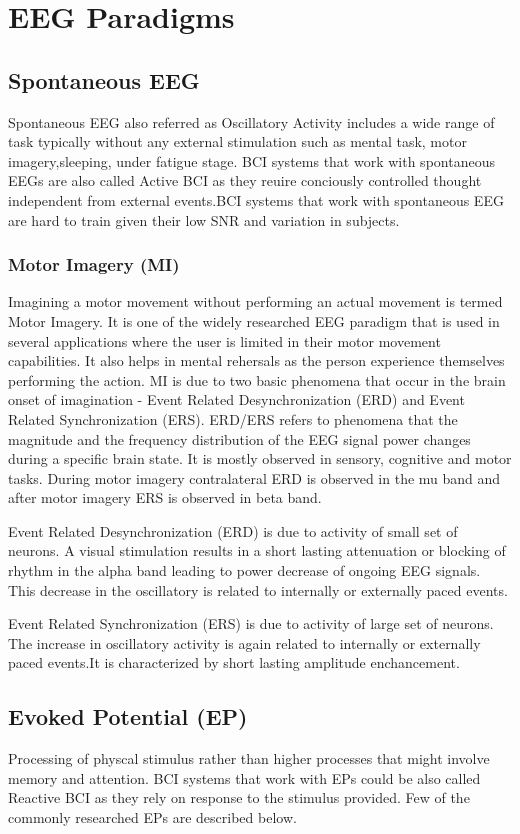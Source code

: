 \section{EEG Paradigms}

\subsection{Spontaneous EEG}
Spontaneous EEG also referred as Oscillatory Activity includes a wide range of task typically without any external stimulation such as mental task, motor imagery,sleeping, under fatigue stage. BCI systems that work with spontaneous EEGs are also called Active BCI as they reuire conciously controlled thought independent from external events.BCI systems that work with spontaneous EEG are hard to train given their low SNR and variation in subjects.

    \subsubsection{Motor Imagery (MI)}
Imagining a motor movement without performing an actual movement is termed Motor Imagery. It is one of the widely researched EEG paradigm that is used in several applications where the user is limited in their motor movement capabilities. It also helps in mental rehersals as the person experience themselves performing the action. MI is due to two basic phenomena that occur in the brain onset of imagination - Event Related Desynchronization (ERD) and Event Related Synchronization (ERS). ERD/ERS refers to 
phenomena that the magnitude and the frequency distribution of the EEG signal power changes during a specific brain state. It is mostly observed in sensory, cognitive and motor tasks. During motor imagery contralateral ERD is observed in the mu band and after motor imagery ERS is observed in beta band.

Event Related Desynchronization (ERD) is due to activity of small set of neurons. A visual stimulation results in a short lasting attenuation or blocking of rhythm in the alpha band leading to power decrease of ongoing EEG signals. This decrease in the oscillatory is related to internally or externally paced events.

Event Related Synchronization (ERS) is due to activity of large set of neurons. The increase in oscillatory activity is again related to internally or externally paced events.It is characterized by short lasting amplitude enchancement.

\subsection{Evoked Potential (EP)}
Processing of physcal stimulus rather than higher processes that might involve memory and attention. BCI systems that work with EPs could be also called Reactive BCI as they rely on response to the stimulus provided. Few of the commonly researched EPs are described below.

